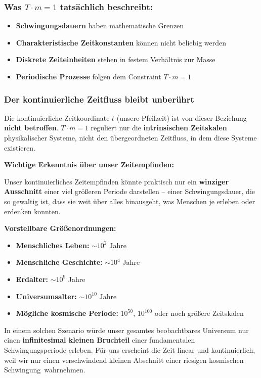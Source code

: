 \subsubsection{Was $T \cdot m = 1$ tatsächlich beschreibt:}
\begin{itemize}
	\item \textbf{Schwingungsdauern} haben mathematische Grenzen
	\item \textbf{Charakteristische Zeitkonstanten} können nicht beliebig werden
	\item \textbf{Diskrete Zeiteinheiten} stehen in festem Verhältnis zur Masse
	\item \textbf{Periodische Prozesse} folgen dem Constraint $T \cdot m = 1$
\end{itemize}

\subsubsection{Der kontinuierliche Zeitfluss bleibt unberührt}

Die kontinuierliche Zeitkoordinate $t$ (unsere \glqq Pfeilzeit\grqq) ist von dieser Beziehung \textbf{nicht betroffen}. $T \cdot m = 1$ reguliert nur die \textbf{intrinsischen Zeitskalen} physikalischer Systeme, nicht den übergeordneten Zeitfluss, in dem diese Systeme existieren.

\textbf{Wichtige Erkenntnis über unser Zeitempfinden:}

Unser kontinuierliches Zeitempfinden könnte praktisch nur ein \textbf{winziger Ausschnitt} einer viel größeren Periode darstellen -- einer Schwingungsdauer, die so gewaltig ist, dass sie weit über alles hinausgeht, was Menschen je erleben oder erdenken konnten.

\textbf{Vorstellbare Größenordnungen:}
\begin{itemize}
	\item \textbf{Menschliches Leben:} $\sim 10^2$ Jahre
	\item \textbf{Menschliche Geschichte:} $\sim 10^4$ Jahre
	\item \textbf{Erdalter:} $\sim 10^9$ Jahre
	\item \textbf{Universumsalter:} $\sim 10^{10}$ Jahre
	\item \textbf{Mögliche kosmische Periode:} $10^{50}$, $10^{100}$ oder noch größere Zeitskalen
\end{itemize}

In einem solchen Szenario würde unser gesamtes beobachtbares Universum nur einen \textbf{infinitesimal kleinen Bruchteil} einer fundamentalen Schwingungsperiode erleben. Für uns erscheint die Zeit linear und kontinuierlich, weil wir nur einen verschwindend kleinen Abschnitt einer riesigen kosmischen \glqq Schwingung\grqq\ wahrnehmen.

